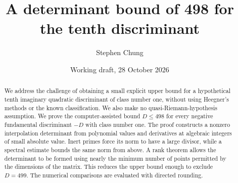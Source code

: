 \documentclass[11pt,reqno]{amsart}
\title[A determinant bound for the tenth discriminant]{A determinant bound of 498 for the tenth discriminant}
\author[Stephen Chung]{Stephen Chung}
\date{Working draft, 28 October 2026}
\numberwithin{equation}{section}
\theoremstyle{remark}
\begin{document}
\begin{abstract}
We address the challenge of obtaining a small explicit upper bound for a
hypothetical tenth imaginary quadratic discriminant of class number one,
without using Heegner's methods or the known classification. We also make no
quasi-Riemann-hypothesis assumption. We prove the
computer-assisted bound $D\leq498$ for every negative fundamental discriminant
$-D$ with class number one. The proof constructs a nonzero interpolation
determinant from polynomial values and derivatives at algebraic integers of
small absolute value. Inert primes force its norm to have a large divisor,
while a spectral estimate bounds the same norm from above. A rank theorem
allows the determinant to be formed using nearly the minimum number
of points permitted by the dimensions of the matrix. This reduces the upper
bound enough to exclude $D=499$. The numerical
comparisons are evaluated with directed rounding.
\end{abstract}
\maketitle





\appendix








\end{document}
